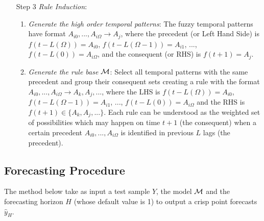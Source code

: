 \begin{enumerate}
\item[Step 3] \textit{Rule Induction}: 
\begin{enumerate}
\item \textit{Generate the high order temporal patterns}: The fuzzy temporal patterns have format $A_{i0},...,A_{i\Omega} \rightarrow A_j$, where the precedent (or Left Hand Side) is $f(t - L(\Omega)) = A_{i0}$, $f(t - L(\Omega-1)) = A_{i1}$, ..., $f(t - L(0)) = A_{i\Omega}$, and the consequent (or RHS) is $f(t+1) = A_j$.

\index{$\model$}
\item \textit{Generate the rule base $\model$}: Select all temporal patterns with the same precedent and group their consequent sets  creating a rule with the format $A_{i0},...,A_{i\Omega} \rightarrow  A_k, A_j,...$, where the LHS is $f(t - L(\Omega)) = A_{i0}$, $f(t - L(\Omega-1)) = A_{i1}$, ..., $f(t - L(0)) = A_{i\Omega}$ and the RHS is $f(t+1) \in \{A_k, A_j,...\}$. Each rule can be understood as the weighted set of possibilities which may happen on time $t+1$ (the consequent) when a certain precedent $A_{i0},...,A_{i\Omega}$ is identified in previous $L$ lags (the precedent).
\end{enumerate}
\end{enumerate}

%
\subsection{Forecasting Procedure}  
\label{sec:fts_forecasting_procedure}

The method below take as input a test sample $Y$, the model $\model$ and the forecasting horizon $H$ (whose default value is 1) to output a crisp point forecasts $\hat{y}_H$.

